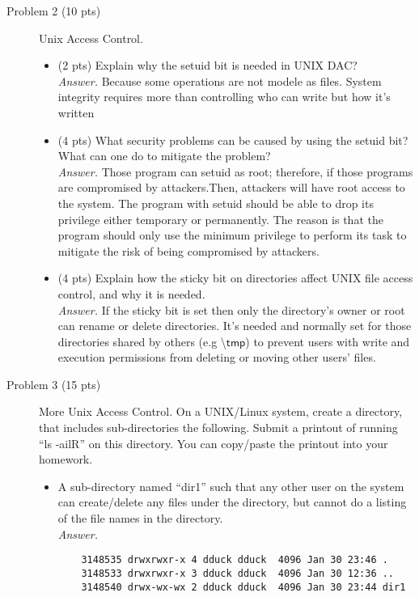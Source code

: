 \documentclass[11pt]{article}
\begin{document}
\begin{description}
 \item[Problem 2  (10 pts)] Unix Access Control.
\begin{itemize}
 \item  (2 pts)
Explain why the setuid bit is needed in UNIX DAC?  
\\
\textit{Answer. } Because some operations are not modele as files. System integrity requires more than controlling who can write but how it's written
 \item  (4 pts)
What security problems can be caused by using the setuid bit?  What can one do to mitigate the problem?
\\
\textit{Answer. }
Those program can setuid as root; therefore, if those programs are compromised by attackers.Then, attackers will have root access to the system. The program with setuid should be able to drop its privilege either temporary or permanently. The reason is that the program should only use the minimum privilege to perform its task to mitigate the risk of being compromised by attackers.
 \item (4 pts)
Explain how the sticky bit on directories affect UNIX file access control, and why it is needed. \\
\textit{Answer.}
If the sticky bit is set then only the directory's owner or root can rename or delete directories. It's needed and normally set for those directories shared by others (e.g \textbackslash$\mathsf{tmp}$) to prevent users with write and execution permissions from deleting or moving other users' files.
\end{itemize}



 \item[Problem 3 (15 pts) ] More Unix Access Control.
On a UNIX/Linux system, create a directory, that includes sub-directories the following.  Submit a printout of running ``ls -ailR'' on this directory.  You can copy/paste the printout into your homework.

\begin{itemize}
 \item
A sub-directory named ``dir1'' such that any other user on the system can create/delete any files under the directory, but cannot do a listing of the file names in the directory.
\\\textit{Answer. }
\begin{verbatim}
	3148535 drwxrwxr-x 4 dduck dduck  4096 Jan 30 23:46 .
	3148533 drwxrwxr-x 3 dduck dduck  4096 Jan 30 12:36 ..
	3148540 drwx-wx-wx 2 dduck dduck  4096 Jan 30 23:44 dir1


\end{verbatim}
\end{itemize}
\end{description}
\end{document}

